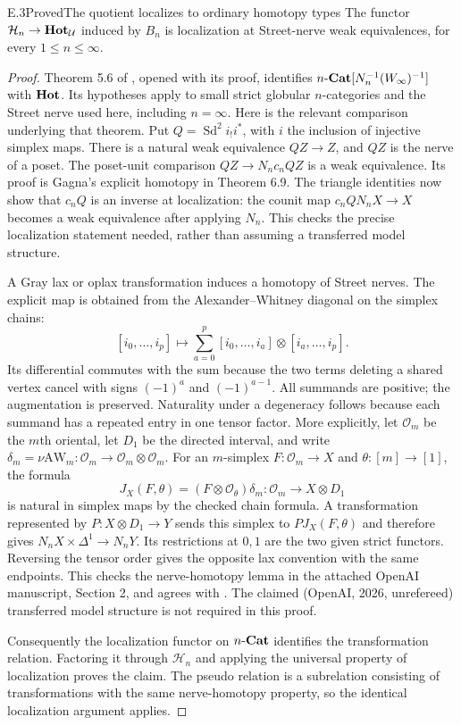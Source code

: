 \begin{claim}{E.3}{Proved}{The quotient localizes to ordinary homotopy types}
The functor $\mathcal H_n\to\mathbf{Hot}_\mathcal U$ induced by $B_n$ is localization at Street-nerve weak equivalences, for every $1\leq n\leq\infty$.
\end{claim}
\begin{proof}
Theorem 5.6 of \citet{Gagna2018}, opened with its proof, identifies $n\text{-}\mathbf{Cat}[N_n^{-1}(W_\infty)^{-1}]$ with $\mathbf{Hot}$. Its hypotheses apply to small strict globular $n$-categories and the Street nerve used here, including $n=\infty$. Here is the relevant comparison underlying that theorem. Put $Q=\operatorname{Sd}^2 i_!i^*$, with $i$ the inclusion of injective simplex maps. There is a natural weak equivalence $QZ\to Z$, and $QZ$ is the nerve of a poset. The poset-unit comparison $QZ\to N_nc_nQZ$ is a weak equivalence. Its proof is Gagna's explicit homotopy in Theorem 6.9. The triangle identities now show that $c_nQ$ is an inverse at localization: the counit map $c_nQN_nX\to X$ becomes a weak equivalence after applying $N_n$. This checks the precise localization statement needed, rather than assuming a transferred model structure.

A Gray lax or oplax transformation induces a homotopy of Street nerves. The explicit map is obtained from the Alexander--Whitney diagonal on the simplex chains:
\[
 [i_0,\ldots,i_p]\longmapsto
 \sum_{a=0}^p[i_0,\ldots,i_a]\otimes[i_a,\ldots,i_p].
\]
Its differential commutes with the sum because the two terms deleting a shared vertex cancel with signs $(-1)^a$ and $(-1)^{a-1}$. All summands are positive; the augmentation is preserved. Naturality under a degeneracy follows because each summand has a repeated entry in one tensor factor. More explicitly, let $\mathcal O_m$ be the $m$th oriental, let $D_1$ be the directed interval, and write $\delta_m=\nu\mathrm{AW}_m:\mathcal O_m\to\mathcal O_m\otimes\mathcal O_m$. For an $m$-simplex $F:\mathcal O_m\to X$ and $\theta:[m]\to[1]$, the formula
\[
 J_X(F,\theta)=(F\otimes\mathcal O_\theta)\delta_m:
 \mathcal O_m\longrightarrow X\otimes D_1
\]
is natural in simplex maps by the checked chain formula. A transformation represented by $P:X\otimes D_1\to Y$ sends this simplex to $P J_X(F,\theta)$ and therefore gives $N_nX\times\Delta^1\to N_nY$. Its restrictions at $0,1$ are the two given strict functors. Reversing the tensor order gives the opposite lax convention with the same endpoints. This checks the nerve-homotopy lemma in the attached OpenAI manuscript, Section 2, and agrees with \citet[\S3.3 and Proposition 3.4]{AraTheoremB}. The claimed (OpenAI, 2026, unrefereed) transferred model structure is not required in this proof.

Consequently the localization functor on $n\text{-}\mathbf{Cat}$ identifies the transformation relation. Factoring it through $\mathcal H_n$ and applying the universal property of localization proves the claim. The pseudo relation is a subrelation consisting of transformations with the same nerve-homotopy property, so the identical localization argument applies.
\end{proof}

